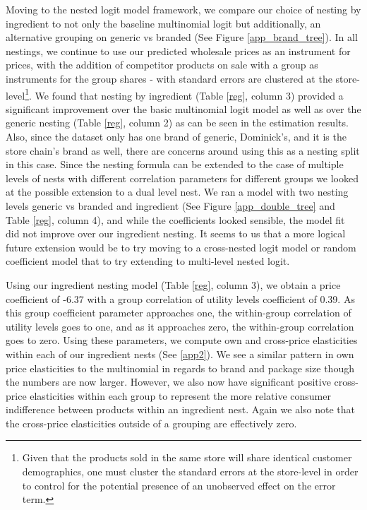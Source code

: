 \documentclass[12pt, authoryear]{elsarticle}
\begin{document}
Moving to the nested logit model framework, we compare our choice of nesting by ingredient to not only the baseline multinomial logit but additionally, an alternative grouping on generic vs branded (See Figure \ref{app_brand_tree}).  In all nestings, we continue to use our predicted wholesale prices as an instrument for prices, with the addition of competitor products on sale with a group as instruments for the group shares - with standard errors are clustered at the store-level\footnote{Given that the products sold in the same store will share identical customer demographics,  one must cluster the standard errors at the store-level in order to control for the potential presence of an unobserved effect on the error term.}.  We found that nesting by ingredient (Table \ref{reg}, column 3) provided a significant improvement over the basic multinomial logit model as well as over the generic nesting (Table \ref{reg}, column 2) as can be seen in the estimation results.  Also, since the dataset only has one brand of generic, Dominick’s, and it is the store chain’s brand as well, there are concerns around using this as a nesting split in this case.  Since the nesting formula can be extended to the case of multiple levels of nests with different correlation parameters for different groups \citep{berry1994estimating} we looked at the possible extension to a dual level nest.  We ran a model with two nesting levels generic vs branded and ingredient (See Figure \ref{app_double_tree} and Table \ref{reg}, column 4), and while the coefficients looked sensible, the model fit did not improve over our ingredient nesting.  It seems to us that a more logical future extension would be to try moving to a cross-nested logit model or random coefficient model that to try extending to multi-level nested logit.

Using our ingredient nesting model (Table \ref{reg}, column 3), we obtain a price coefficient of -6.37 with a group correlation of utility levels coefficient of 0.39.  As this group coefficient parameter approaches one, the within-group correlation of utility levels goes to one, and as it approaches zero, the within-group correlation goes to zero.  Using these parameters, we compute own and cross-price elasticities within each of our ingredient nests (See \ref{app2}).  We see a similar pattern in own price elasticities to the multinomial in regards to brand and package size though the numbers are now larger.  However, we also now have significant positive cross-price elasticities within each group to represent the more relative consumer indifference between products within an ingredient nest.  Again we also note that the cross-price elasticities outside of a grouping are effectively zero.
\end{document}
